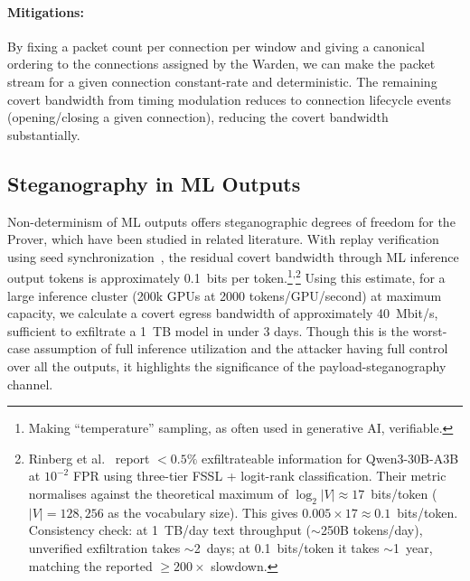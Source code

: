 \documentclass{article}
\begin{document}
\paragraph{Mitigations:} By fixing a packet count per connection per window and giving a canonical ordering to the connections assigned by the Warden, we can make the packet stream for a given connection constant-rate and deterministic. The remaining covert bandwidth from timing modulation reduces to connection lifecycle events (opening/closing a given connection), reducing the covert bandwidth substantially.

\subsection{Steganography in ML Outputs}

Non-determinism of ML outputs offers steganographic degrees of freedom for the Prover, which have been studied in related literature. With replay verification using seed synchronization~\cite{rinberg2025verifying}, the residual covert bandwidth through ML inference output tokens is approximately 0.1~bits per token.\footnote{Making ``temperature'' sampling, as often used in generative AI, verifiable.}\textsuperscript{,}\footnote{Rinberg et al.~\cite{rinberg2025verifying} report $<0.5\%$ exfiltrateable information for Qwen3-30B-A3B at $10^{-2}$ FPR using three-tier FSSL + logit-rank classification. Their metric normalises against the theoretical maximum of $\log_2|V| \approx 17$~bits/token ($|V| = 128{,}256$ as the vocabulary size). This gives $0.005 \times 17 \approx 0.1$~bits/token. Consistency check: at 1~TB/day text throughput ($\sim$250B tokens/day), unverified exfiltration takes $\sim$2~days; at 0.1~bits/token it takes $\sim$1~year, matching the reported $\geq 200\times$ slowdown.} Using this estimate, for a large inference cluster (200k GPUs at 2000 tokens/GPU/second) at maximum capacity, we calculate a covert egress bandwidth of approximately 40~Mbit/s, sufficient to exfiltrate a 1~TB model in under 3 days. Though this is the worst-case assumption of full inference utilization and the attacker having full control over all the outputs, it highlights the significance of the payload-steganography channel.
\end{document}
